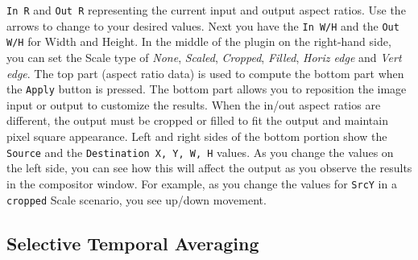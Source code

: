\texttt{In R} and \texttt{Out R} representing the current input and output aspect ratios. Use the arrows to change to your desired values. Next you have the \texttt{In W/H} and the \texttt{Out W/H} for Width and Height. In the middle of the plugin on the right-hand side, you can set the Scale type of \textit{None}, \textit{Scaled}, \textit{Cropped}, \textit{Filled}, \textit{Horiz edge} and \textit{Vert edge}. The top part (aspect ratio data) is used to compute the bottom part when the \texttt{Apply} button is pressed. The bottom part allows you to reposition the image input or output to customize the results. When the in/out aspect ratios are different, the output must be cropped or filled to fit the output and maintain pixel square appearance. Left and right sides of the bottom portion show the \texttt{Source} and the \texttt{Destination X, Y, W, H} values. As you change the values on the left side, you can see how this will affect the output as you observe the results in the compositor window. For example, as you change the values for \texttt{SrcY} in a \texttt{cropped} Scale scenario, you see up/down movement.

\subsection{Selective Temporal Averaging}%
\label{sub:selective_temporal_averaging}

